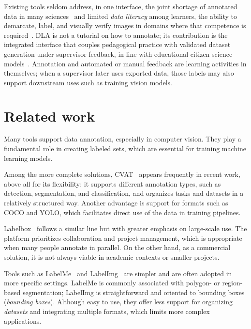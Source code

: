 \documentclass[runningheads]{llncs}
\begin{document}
Existing tools seldom address, in one interface, the joint shortage of annotated data in many sciences~\cite{willemink2020preparing,esteva2017dermatologist} and limited \emph{data literacy} among learners, the ability to demarcate, label, and visually verify images in domains where that competence is required~\cite{wolff2016data,pangrazio2019personal}. DLA is not a tutorial on how to annotate; its contribution is the integrated interface that couples pedagogical practice with validated dataset generation under supervisor feedback, in line with educational citizen-science models~\cite{wiggins2011citizen}. Annotation and automated or manual feedback are learning activities in themselves; when a supervisor later uses exported data, those labels may also support downstream uses such as training vision models.

\section{Related work}

Many tools support data annotation, especially in computer vision. They play a fundamental role in creating labeled sets, which are essential for training machine learning models.

Among the more complete solutions, CVAT~\cite{cvat} appears frequently in recent work, above all for its flexibility: it supports different annotation types, such as detection, segmentation, and classification, and organizes tasks and datasets in a relatively structured way. Another advantage is support for formats such as COCO and YOLO, which facilitates direct use of the data in training pipelines.

Labelbox~\cite{labelbox} follows a similar line but with greater emphasis on large-scale use. The platform prioritizes collaboration and project management, which is appropriate when many people annotate in parallel. On the other hand, as a commercial solution, it is not always viable in academic contexts or smaller projects.

Tools such as LabelMe~\cite{russell2008labelme} and LabelImg~\cite{labelimg} are simpler and are often adopted in more specific settings. LabelMe is commonly associated with polygon- or region-based segmentation; LabelImg is straightforward and oriented to bounding boxes (\emph{bounding boxes}). Although easy to use, they offer less support for organizing \textit{datasets} and integrating multiple formats, which limits more complex applications.
\end{document}
